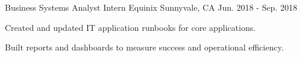 \begin{cventries}
  \cventry
    {Business Systems Analyst Intern} %
    {Equinix} %
    {Sunnyvale, CA} %
    {Jun. 2018 - Sep. 2018} %
    {
      \begin{cvitems} %
        \item {Created and updated IT application runbooks for core applications.}
        \item {Built reports and dashboards to measure success and operational efficiency.}
      \end{cvitems}
    }

\end{cventries}
